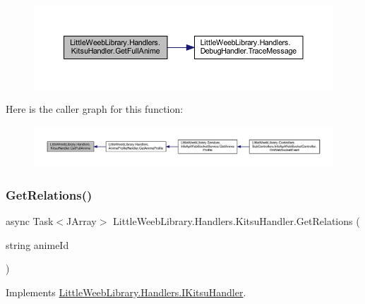 \begin{figure}[H]
\begin{center}
\leavevmode
\includegraphics[width=350pt]{class_little_weeb_library_1_1_handlers_1_1_kitsu_handler_a5f655ed8b3e26f6d6767e090eea9e3bb_cgraph}
\end{center}
\end{figure}
Here is the caller graph for this function\+:\nopagebreak
\begin{figure}[H]
\begin{center}
\leavevmode
\includegraphics[width=350pt]{class_little_weeb_library_1_1_handlers_1_1_kitsu_handler_a5f655ed8b3e26f6d6767e090eea9e3bb_icgraph}
\end{center}
\end{figure}
\mbox{\label{class_little_weeb_library_1_1_handlers_1_1_kitsu_handler_ad1ba51037e72c80804018f4c1df37581}} 
\subsubsection{\texorpdfstring{Get\+Relations()}{GetRelations()}}
{\footnotesize\ttfamily async Task$<$J\+Array$>$ Little\+Weeb\+Library.\+Handlers.\+Kitsu\+Handler.\+Get\+Relations (\begin{DoxyParamCaption}\item[{string}]{anime\+Id }\end{DoxyParamCaption})}



Implements \mbox{\hyperlink{interface_little_weeb_library_1_1_handlers_1_1_i_kitsu_handler_aa82bf536086211de6b458610b83ed43f}{Little\+Weeb\+Library.\+Handlers.\+I\+Kitsu\+Handler}}.



